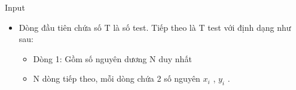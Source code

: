 Input
\begin{itemize}
	\item Dòng đầu tiên chứa số T là số test. Tiếp theo là T test với định dạng như sau:
\begin{itemize}
	\item Dòng 1: Gồm số nguyên dương N duy nhất
	\item N dòng tiếp theo, mỗi dòng chứa 2 số nguyên $x_{i}$ , $y_{i}$ .
\end{itemize}
\end{itemize}